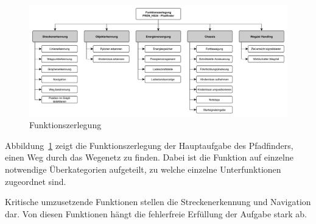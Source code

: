 \documentclass[../main.tex]{subfiles}
\begin{document}
\begin{figure}[h!]
    \centering
    \includegraphics[width=1\textwidth]{./resources/Funktionszerlegung}
    \caption{Funktionszerlegung}\label{fig:Funktionszerlegung}
\end{figure}

Abbildung~\ref{fig:Funktionszerlegung} zeigt die Funktionszerlegung der
Hauptaufgabe des Pfadfinders, einen Weg durch das Wegenetz zu finden. Dabei ist
die Funktion auf einzelne notwendige Überkategorien aufgeteilt, zu welche
einzelne Unterfunktionen zugeordnet sind.

Kritische umzusetzende Funktionen stellen die Streckenerkennung und Navigation
dar. Von diesen Funktionen hängt die fehlerfreie Erfüllung der Aufgabe stark
ab.
\end{document}
